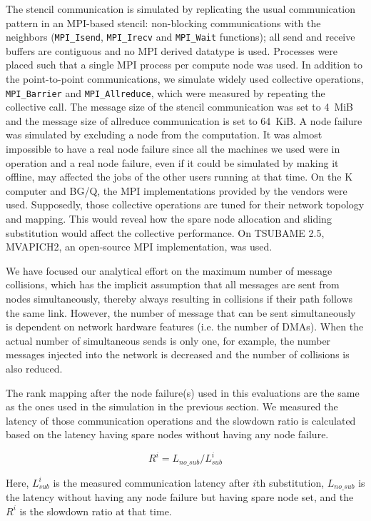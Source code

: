 \documentclass[Afour,times,sageh]{sagej}
\begin{document}
The stencil communication is simulated by replicating the usual
communication pattern in an MPI-based stencil: non-blocking communications with
the neighbors ({\tt MPI\_Isend}, {\tt MPI\_Irecv} and {\tt MPI\_Wait}
functions); all send and receive buffers are contiguous and no MPI derived
datatype is used.
%
Processes were placed such that a single MPI process per compute node was used.
In addition to the point-to-point communications, we simulate widely used
collective operations, {\tt MPI\_Barrier} and {\tt MPI\_Allreduce}, which were
measured by repeating the collective call. The message size of the stencil
communication was set to 4~MiB and the message size of allreduce communication
is set to 64~KiB.
%
A node failure was simulated by excluding a node from the
computation. It was almost impossible to have a real node failure since
all the machines we used were in operation and a real node failure,
even if it could be simulated by making it offline, may affected
the jobs of the other users running at that time.
%
On the K computer and BG/Q, the MPI implementations provided by the vendors were
used. Supposedly, those collective operations are tuned for their network
topology and mapping.  This would reveal how the spare node allocation and
sliding substitution would affect the collective performance. On TSUBAME 2.5,
MVAPICH2, an open-source MPI implementation, was used.

We have focused our analytical effort on the
maximum number of message collisions, which has the implicit
assumption that all messages are sent from nodes simultaneously,
thereby always resulting in collisions if their path follows the same
link. However, the number of message that can be sent simultaneously
is dependent on network hardware features (i.e. the number of
DMAs). When the actual number of simultaneous sends is only one, for
example, the number messages injected into the network is decreased
and the number of collisions is also reduced.

The rank mapping after the node
failure(s) used in this evaluations are the same as the ones used in
the simulation in the previous section.
We measured the latency of those communication operations and the
slowdown ratio is calculated based on the latency having spare
nodes without having any node failure.

\[
R^i = L_{no\_sub} / L_{sub}^i
\]

Here, $L_{sub}^i$ is the measured communication latency after
$i$th substitution, $L_{no\_sub}$ is the latency without having any
node failure but having spare node set, and the $R^i$ is the
slowdown ratio at that time.
\end{document}

